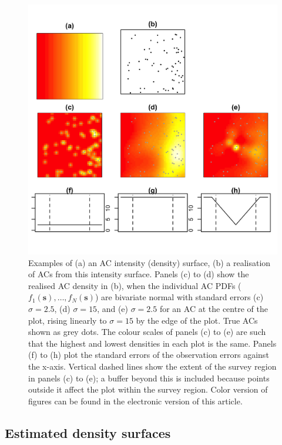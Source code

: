 \documentclass[useAMS,usenatbib,referee]{biom}
\begin{document}
\begin{figure}[htbp]
\centering
\includegraphics[width=\textwidth]{example-densities.jpg}
\caption{Examples of (a) an AC intensity (density) surface, (b) a realisation of ACs from this intensity surface. Panels (c) to (d) show the realised AC density in (b), when the individual AC PDFs ($f_1(\bm{s}),\ldots,f_N(\bm{s})$) are bivariate normal with standard errors (c) $\sigma=2.5$, (d) $\sigma=15$, and (e) $\sigma=2.5$ for an AC at the centre of the plot, rising linearly to $\sigma=15$ by the edge of the plot. True ACs shown as grey dots. The colour scales of panels (c) to (e) are such that the highest and lowest densities in each plot is the same. Panels (f) to (h) plot the standard errors of the observation errors against the x-axis. Vertical dashed lines show the extent of the survey region in panels (c) to (e); a buffer beyond this is included because points outside it affect the plot within the survey region. Color version of figures can be found in the electronic version of this article.}
\label{fig:densities}
\end{figure}

\subsection{Estimated density surfaces}
\end{document}
